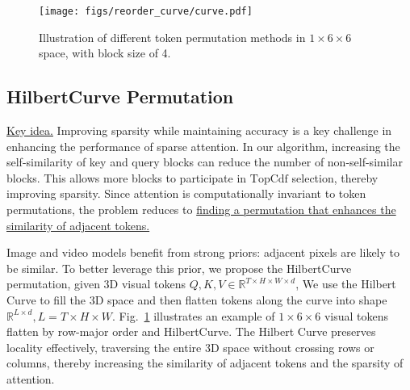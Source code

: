 \begin{figure}[!h]
    \centering
    \vspace{-1em}
    \texttt{[image: figs/reorder\_curve/curve.pdf]}
    \vspace{-2.1em}
    \caption{Illustration of different token permutation methods in $1\times 6 \times 6$ space, with block size of 4.}
    \vspace{-1em}
    \label{fig:hilbertcurve}
\end{figure}

\subsection{HilbertCurve Permutation}
\label{sec:hilbert} 
\underline{Key idea.} Improving sparsity while maintaining accuracy is a key challenge in enhancing the performance of sparse attention. In our algorithm, increasing the self-similarity of key and query blocks can reduce the number of non-self-similar blocks.
This allows more blocks to participate in $\mathrm{TopCdf}$ selection, thereby improving sparsity. 
Since attention is computationally invariant to token permutations, the problem reduces to \uline{finding a permutation that enhances the similarity of adjacent tokens.}

Image and video models benefit from strong priors: adjacent pixels are likely to be similar.
To better leverage this prior, we propose the HilbertCurve permutation, given 3D visual tokens $Q, K, V \in \mathbb{R}^{T\times H \times W \times d}$,
We use the Hilbert Curve to fill the 3D space and then flatten tokens along the curve into shape $\mathbb{R}^{L \times d}, L = T \times H \times W$. 
Fig.~\ref{fig:hilbertcurve} illustrates an example of $1\times 6\times 6$ visual tokens flatten by row-major order and HilbertCurve.
The Hilbert Curve preserves locality effectively, traversing the entire 3D space without crossing rows or columns, thereby increasing the similarity of adjacent tokens and the sparsity of attention.







